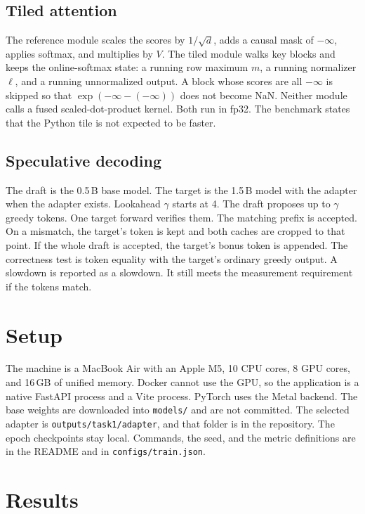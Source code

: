 \documentclass[conference]{IEEEtran}
\begin{document}
\subsection{Tiled attention}
The reference module scales the scores by $1/\sqrt{d}$, adds a causal mask of $-\infty$, applies softmax, and multiplies by $V$.
The tiled module walks key blocks and keeps the online-softmax state: a running row maximum $m$, a running normalizer $\ell$, and a running unnormalized output.
A block whose scores are all $-\infty$ is skipped so that $\exp(-\infty-(-\infty))$ does not become NaN.
Neither module calls a fused scaled-dot-product kernel.
Both run in fp32.
The benchmark states that the Python tile is not expected to be faster.

\subsection{Speculative decoding}
The draft is the 0.5\,B base model.
The target is the 1.5\,B model with the adapter when the adapter exists.
Lookahead $\gamma$ starts at 4.
The draft proposes up to $\gamma$ greedy tokens.
One target forward verifies them.
The matching prefix is accepted.
On a mismatch, the target's token is kept and both caches are cropped to that point.
If the whole draft is accepted, the target's bonus token is appended.
The correctness test is token equality with the target's ordinary greedy output.
A slowdown is reported as a slowdown. It still meets the measurement requirement if the tokens match.

\section{Setup}
The machine is a MacBook Air with an Apple M5, 10 CPU cores, 8 GPU cores, and 16\,GB of unified memory.
Docker cannot use the GPU, so the application is a native FastAPI process and a Vite process.
PyTorch uses the Metal backend.
The base weights are downloaded into \texttt{models/} and are not committed.
The selected adapter is \texttt{outputs/task1/adapter}, and that folder is in the repository.
The epoch checkpoints stay local.
Commands, the seed, and the metric definitions are in the README and in \texttt{configs/train.json}.

\section{Results}
\label{sec:results}

\end{document}
